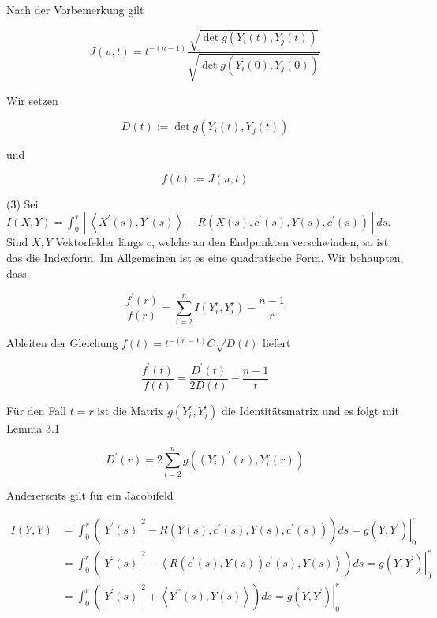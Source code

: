 \documentclass[10pt, letterpaper]{article}
\begin{document}
Nach der Vorbemerkung gilt

$$
J(u, t)=t^{-(n-1)} \frac{\sqrt{\operatorname{det} g\left(Y_{i}(t), Y_{j}(t)\right)}}{\sqrt{\operatorname{det} g\left(Y_{i}^{\prime}(0), Y_{j}^{\prime}(0)\right)}}
$$

Wir setzen

$$
D(t):=\operatorname{det} g\left(Y_{i}(t), Y_{j}(t)\right)
$$

und

$$
f(t):=J(u, t)
$$

(3) Sei\\
$I(X, Y)=\int_{0}^{r}\left[\left\langle X^{\prime}(s), Y^{\prime}(s)\right\rangle-R\left(X(s), c^{\prime}(s), Y(s), c^{\prime}(s)\right)\right] d s$.\\
Sind $X, Y$ Vektorfelder längs $c$, welche an den Endpunkten verschwinden, so ist das die Indexform. Im Allgemeinen ist es eine quadratische Form. Wir behaupten, dass


\begin{equation*}
\frac{f^{\prime}(r)}{f(r)}=\sum_{i=2}^{n} I\left(Y_{i}^{r}, Y_{i}^{r}\right)-\frac{n-1}{r} \tag{12}
\end{equation*}


Ableiten der Gleichung $f(t)=t^{-(n-1)} C \sqrt{D(t)}$ liefert

$$
\frac{f^{\prime}(t)}{f(t)}=\frac{D^{\prime}(t)}{2 D(t)}-\frac{n-1}{t}
$$

Für den Fall $t=r$ ist die Matrix $g\left(Y_{i}^{r}, Y_{j}^{r}\right)$ die Identitätsmatrix und es folgt mit Lemma 3.1

$$
D^{\prime}(r)=2 \sum_{i=2}^{n} g\left(\left(Y_{i}^{r}\right)^{\prime}(r), Y_{i}^{r}(r)\right)
$$

Andererseits gilt für ein Jacobifeld

$$
\begin{aligned}
I(Y, Y) & =\int_{0}^{r}\left(\left|Y^{\prime}(s)\right|^{2}-R\left(Y(s), c^{\prime}(s), Y(s), c^{\prime}(s)\right)\right) d s=\left.g\left(Y, Y^{\prime}\right)\right|_{0} ^{r} \\
& =\int_{0}^{r}\left(\left|Y^{\prime}(s)\right|^{2}-\left\langle R\left(c^{\prime}(s), Y(s)\right) c^{\prime}(s), Y(s)\right\rangle\right) d s=\left.g\left(Y, Y^{\prime}\right)\right|_{0} ^{r} \\
& =\int_{0}^{r}\left(\left|Y^{\prime}(s)\right|^{2}+\left\langle Y^{\prime \prime}(s), Y(s)\right\rangle\right) d s=\left.g\left(Y, Y^{\prime}\right)\right|_{0} ^{r}
\end{aligned}
$$
\end{document}
